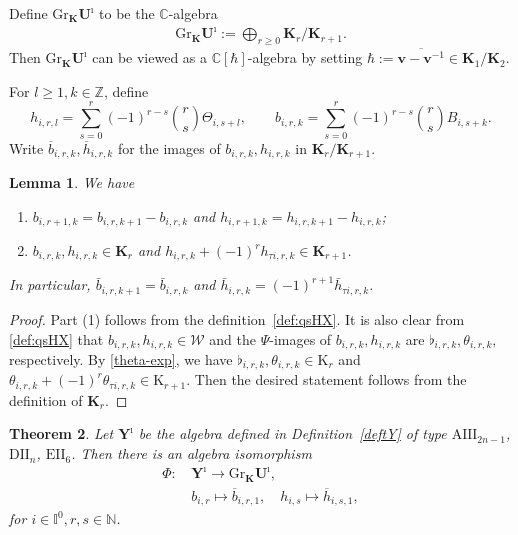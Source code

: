 \documentclass[11pt,reqno]{amsart}
\numberwithin{equation}{section}
\newtheorem{thm}{Theorem}[section]
\newtheorem{lem}[thm]{Lemma}
\theoremstyle{definition}
\theoremstyle{remark}
\newcommand{\beq}{\begin{equation}}
\newcommand{\eeq}{\end{equation}}
\newcommand{\bK}{\mathbb{K}}
\newcommand{\gge}{\geqslant}
\newcommand{\Yi}{{\mathbf{Y}^\imath}}
\newcommand{\bv}{{\bm{v}}}
\def \h{\hbar}
\def \H{h}
\def \X{b}
\def \Gr{\mathrm{Gr}}
\def \I{\mathbb{I}}
\def \N{\mathbb{N}}
\def \tUi{\mathbf{U}^\imath}
\def \Z{\mathbb{Z}}
\def \bK{\mathbf{K}}
\def \C{\mathbb{C}}
\def \ov{\overline}
\begin{document}
Define $\Gr_{\mathbf K} \tUi$ to be the $\C$-algebra 
\begin{align}
\Gr_{\mathbf K} \tUi:=\bigoplus_{r\gge 0} \mathbf{K}_r/\mathbf{K}_{r+1}.
\end{align}
Then $\Gr_{\mathbf K} \tUi$ can be viewed as a $\C[\h]$-algebra by setting $\h:=\ov{\bv-\bv^{-1}}\in \bK_1/\bK_2$.

For $l\gge 1, k\in\Z$, define 
\beq\label{def:qsHX}
\H_{i,r,l}=\sum_{s=0}^r (-1)^{r-s}\binom{r}{s}\Theta_{i,s+l},\qquad \X_{i,r,k}=\sum_{s=0}^r (-1)^{r-s}\binom{r}{s}B_{i,s+k}.
\eeq
Write $\ov{\X}_{i,r,k},\ov{\H}_{i,r,k}$ for the images of  $\X_{i,r,k},\H_{i,r,k}$ in $\bK_r/\bK_{r+1}$.

\begin{lem}\label{qslemma1}
We have
\begin{enumerate}
\item $\X_{i,r+1,k}=\X_{i,r,k+1}-\X_{i,r,k}$ and $ \H_{i,r+1,k}=\H_{i,r,k+1}-\H_{i,r,k}$;
\item $\X_{i,r,k},\H_{i,r,k}\in \bK_r$ and $\H_{i,r,k}+(-1)^r\H_{\tau i,r,k}\in \bK_{r+1}$.
\end{enumerate}
In particular, $\bar\X_{i,r,k+1}=\bar\X_{i,r,k}$ and $\bar\H_{i,r,k}=(-1)^{r+1}\bar \H_{\tau i,r,k}$.
\end{lem}

\begin{proof}
Part (1) follows from the definition~\eqref{def:qsHX}. It is also clear from \eqref{def:qsHX} that $\X_{i,r,k},\H_{i,r,k}\in \mathcal W$ and the $\Psi$-images of $\X_{i,r,k},\H_{i,r,k}$ are $\flat_{i,r,k},\theta_{i,r,k}$, respectively. By \eqref{theta-exp}, we have $\flat_{i,r,k},\theta_{i,r,k}\in \mathrm{K}_r$ and $\theta_{i,r,k}+(-1)^r\theta_{\tau i,r,k}\in \mathrm K_{r+1}$. Then the desired statement follows from the definition of $\bK_r$.
\end{proof}


\begin{thm}\label{thm:main1} 
Let $\Yi$ be the algebra defined in Definition~\ref{deftY} of type $\mathrm{AIII}_{2n-1}$, $\mathrm{DII}_n$, $\mathrm{EII}_6$. Then there is an algebra isomorphism
\beq\label{isophi}
\begin{split}
\Phi:&\,\Yi \rightarrow \Gr_{\bK}\tUi, \\
&\, \X_{i,r} \mapsto \ov{\X}_{i,r,1},\quad
\H_{i,s} \mapsto \ov{\H}_{i,s,1},
\end{split}
\eeq
for $i\in \I^0,r,s\in \N$.
\end{thm}
\end{document}
